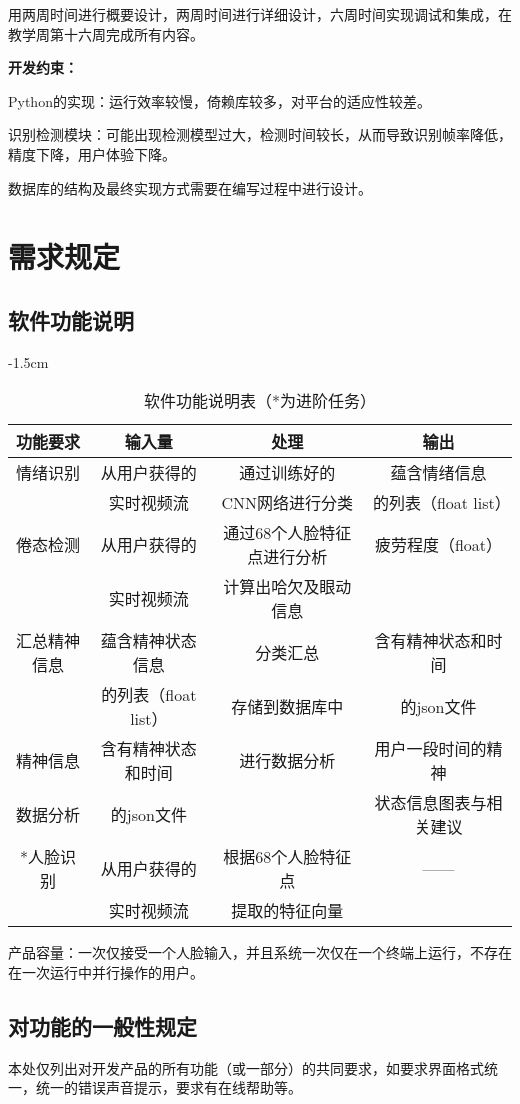 \documentclass[a4paper]{ctexart}%
\begin{document}
	用两周时间进行概要设计，两周时间进行详细设计，六周时间实现调试和集成，在教学周第十六周完成所有内容。
	
	\textbf{开发约束：}
	
	Python的实现：运行效率较慢，倚赖库较多，对平台的适应性较差。
	
	识别检测模块：可能出现检测模型过大，检测时间较长，从而导致识别帧率降低，精度下降，用户体验下降。
	
	数据库的结构及最终实现方式需要在编写过程中进行设计。
	\newpage
	\section{需求规定}
	\subsection{软件功能说明}
	\begin{table}[h]
		\centering
		\addtolength{\leftskip} {-1.5cm}
		\begin{tabular}{|c |c |c |c|}
			\hline
			功能要求&输入量&处理&输出\\\hline
			情绪识别&从用户获得的&通过训练好的&蕴含情绪信息\\
			&实时视频流&CNN网络进行分类&的列表（float list）\\\hline
			倦态检测&从用户获得的&通过68个人脸特征点进行分析&疲劳程度（float）\\
			&实时视频流&计算出哈欠及眼动信息&\\\hline
			汇总精神信息&蕴含精神状态信息&分类汇总&含有精神状态和时间\\
			&的列表（float list）&存储到数据库中&的json文件\\\hline
			精神信息&含有精神状态和时间&进行数据分析&用户一段时间的精神\\
			数据分析&的json文件&&状态信息图表与相关建议\\
			\hline
			*人脸识别&从用户获得的&根据68个人脸特征点	&——\\
			&实时视频流&提取的特征向量&\\\hline
		\end{tabular}
	\caption{软件功能说明表（*为进阶任务）}
	
	\end{table}

   产品容量：一次仅接受一个人脸输入，并且系统一次仅在一个终端上运行，不存在在一次运行中并行操作的用户。
	\subsection{对功能的一般性规定}
	本处仅列出对开发产品的所有功能（或一部分）的共同要求，如要求界面格式统一，统一的错误声音提示，要求有在线帮助等。
\end{document}
